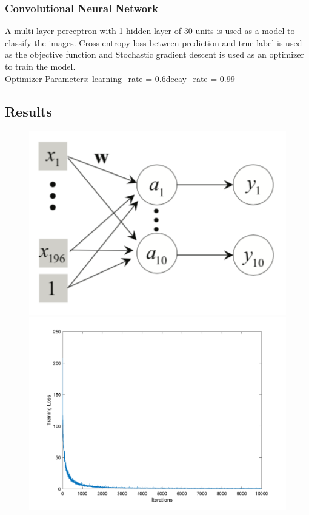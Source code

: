 \documentclass[letter, 10pt]{article}
\begin{document}
\subsubsection*{Convolutional Neural Network}
A multi-layer perceptron with 1 hidden layer of 30 units is used as a model to classify the images. Cross entropy loss between prediction and true label is used as the objective function and Stochastic gradient descent is used as an optimizer to train the model.\\
\underline{Optimizer Parameters}: learning\_rate = 0.6\quad decay\_rate = 0.99\\

\subsection*{Results}
\begin{figure}[H]
        \centering
        \includegraphics[width=\textwidth]{HW4/RESULT/SLP_linear.png}
    \endminipage\hfill
        \centering
        \includegraphics[width=1.1\textwidth]{HW4/RESULT/SLP_linear_loss.png}

\end{figure}
\end{document}
